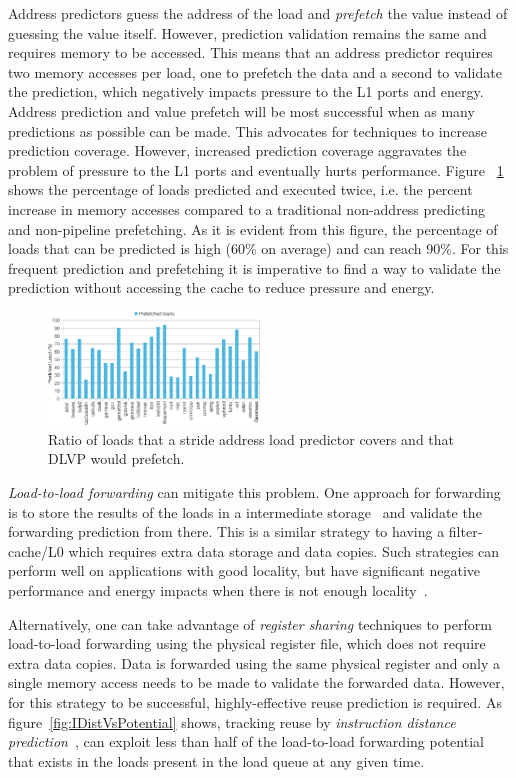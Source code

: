 \documentclass{sig-alternate}
\begin{document}
Address predictors guess the address of the load and \emph{prefetch} the value instead of guessing the value itself. However, prediction validation remains the same and requires memory to be accessed. This means that an address predictor requires two memory accesses per load, one to prefetch the data and a second to validate the prediction, which negatively impacts pressure to the L1 ports and energy. Address prediction and value prefetch will be most successful when as many predictions as possible can be made. This advocates for techniques to increase prediction coverage. However, increased prediction coverage aggravates the problem of pressure to the L1 ports and eventually hurts performance. Figure ~\ref{fig:PrefetchedLoads} shows the percentage of loads predicted and executed twice, i.e. the percent increase in memory accesses compared to a traditional non-address predicting and non-pipeline prefetching.
As it is evident from this figure, the percentage of loads that can be predicted is high (60\% on average) and can reach 90\%. For this frequent prediction and prefetching it is imperative to find a way to validate the prediction without accessing the cache to reduce pressure and energy.


\begin{figure}[ht]
\centerline{\includegraphics[width=0.50\textwidth]{graphs/PrefetchedLoads.pdf}}
\caption{Ratio of loads that a stride address load predictor covers and that DLVP would prefetch.}
\label{fig:PrefetchedLoads}
\end{figure}


\textit{Load-to-load forwarding} can mitigate this problem. One approach for forwarding is to store the results of the loads in a intermediate storage~\cite{nicolaescu2003, carazo2010l1, AVPP/orosa18} and validate the forwarding prediction from there. This is a similar strategy to having a filter-cache/L0 which requires extra data storage and data copies. Such strategies can perform well on applications with good locality, but have significant negative performance and energy impacts when there is not enough locality~\cite{SBAC-PAD/2017addressing}.  

Alternatively, one can take advantage of \textit{register sharing} techniques to perform load-to-load forwarding using the physical register file, which does not require extra data copies. Data is forwarded using the same physical register and only a single memory access needs to be made to validate the forwarded data. However, for this strategy to be successful, highly-effective reuse prediction is required. As figure~\ref{fig:IDistVsPotential} shows, tracking reuse by  \textit{instruction distance prediction}~\cite{ISRB/perais16}, can exploit less than half of the load-to-load forwarding potential that exists in the loads present in the load queue at any given time.
\end{document}
